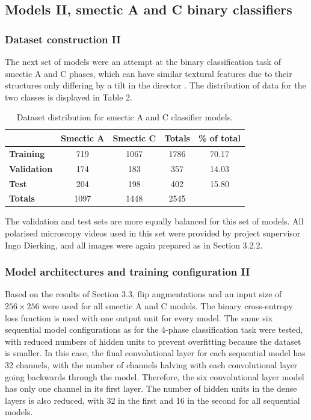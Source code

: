 \documentclass[12pt]{article}
\begin{document}
\subsection{Models II, smectic A and C binary classifiers}
\subsubsection{Dataset construction II}
The next set of models were an attempt at the binary classification task of smectic A and C phases, which can have similar textural features due to their structures only differing by a tilt in the director \cite{Dierking03}. The distribution of data for the two classes is displayed in Table 2.
\begin{table}[!htb]
\begin{center}
\caption{Dataset distribution for smectic A and C classifier models.}
\begin{tabular}{l|c|c|c|c}
\toprule
& \textbf{Smectic A} & \textbf{Smectic C} & \textbf{Totals} & \textbf{\% of total}\\
\midrule
\textbf{Training} & 719 & 1067 & 1786 & 70.17\\
\textbf{Validation} & 174 & 183 & 357 & 14.03\\
\textbf{Test} & 204 & 198 & 402 & 15.80\\
\midrule
\textbf{Totals} & 1097 & 1448 & 2545\\
\bottomrule
\end{tabular}
\end{center}
\end{table}
The validation and test sets are more equally balanced for this set of models. All polarised microscopy videos used in this set were provided by project supervisor Ingo Dierking, and all images were again prepared as in Section 3.2.2.
\subsubsection{Model architectures and training configuration II}
Based on the results of Section 3.3, flip augmentations and an input size of $256 \times 256$ were used for all smectic A and C models. The binary cross-entropy loss function is used with one output unit for every model. The same six sequential model configurations as for the 4-phase classification task were tested, with reduced numbers of hidden units to prevent overfitting because the dataset is smaller. In this case, the final convolutional layer for each sequential model has 32 channels, with the number of channels halving with each convolutional layer going backwards through the model. Therefore, the six convolutional layer model has only one channel in its first layer. The number of hidden units in the dense layers is also reduced, with 32 in the first and 16 in the second for all sequential models.
\end{document}
